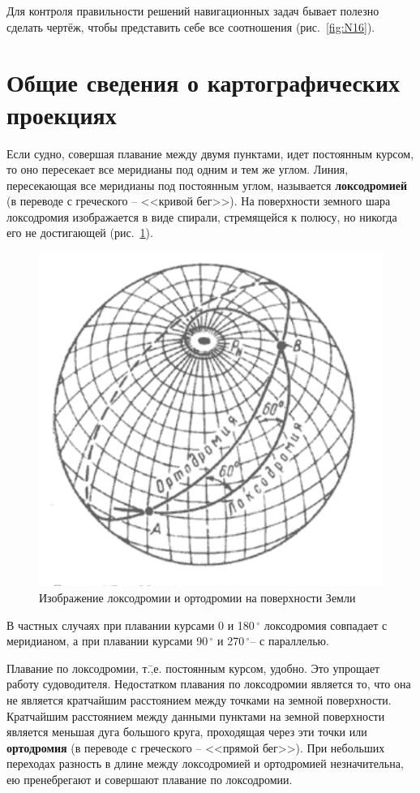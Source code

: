 \documentclass[a4paper, 12pt, twoside, final, book, russian, fittopage, cyremdash]{ncc}
\newcommand{\gr}{\ensuremath{\,^\circ}\xspace}
\newcommand{\ris}[1]{\ref{fig:#1}}
\begin{document}
Для контроля правильности решений навигационных задач бывает полезно сделать чертёж, чтобы представить себе все соотношения (рис.~\ris{N16}). 

\section{Общие сведения о картографических проекциях}

Если судно, совершая плавание между двумя пунктами, идет постоянным курсом, то оно пересекает все меридианы под одним и тем же углом. Линия, пересекающая все меридианы под постоянным углом, называется \textbf{локсодромией} (в переводе с греческого \--- <<кривой бег>>). На поверхности земного шара локсодромия изображается в виде спирали, стремящейся к полюсу, но никогда его не достигающей (рис.~\ris{N25}). 

\begin{figure}[htb]
  \centering{}
  \includegraphics{N025}
  \caption{Изображение локсодромии и ортодромии на поверхности Земли}
  \label{fig:N25}
\end{figure}

В частных случаях при плавании курсами 0 и 180\gr локсодромия совпадает с меридианом, а при плавании курсами 90\gr и 270\gr \--- с параллелью. 

Плавание по локсодромии, т.\=,е. постоянным курсом, удобно. Это упрощает работу судоводителя. Недостатком плавания по локсодромии является то, что она не является кратчайшим расстоянием между точками на земной поверхности. Кратчайшим расстоянием между данными пунктами на земной поверхности является меньшая дуга большого круга, проходящая через эти точки или \textbf{ортодромия} (в переводе с греческого \--- <<прямой бег>>). При небольших переходах разность в длине между локсодромией и ортодромией незначительна, ею пренебрегают и совершают плавание по локсодромии. 
\end{document}

